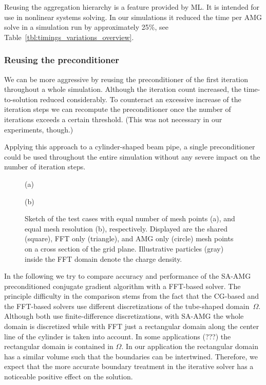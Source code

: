 Reusing the aggregation hierarchy is a feature provided by ML.  It is
intended for use in nonlinear systems solving.  In our simulations it
reduced the time per AMG solve in a simulation run by approximately
25\%, see Table~\ref{tbl:timings_variations_overview}.

\subsubsection*{Reusing the preconditioner}

We can be more aggressive by reusing the preconditioner of the first
iteration throughout a whole simulation.  Although the iteration count
increased, the time-to-solution reduced considerably.  To counteract an
excessive increase of the iteration steps we can recompute the
preconditioner once the number of iterations exceeds a certain
threshold.  (This was not necessary in our experiments, though.)

Applying this approach to a cylinder-shaped beam pipe, a single
preconditioner could be used throughout the entire simulation without
any severe impact on the number of iteration steps.

\begin{figure}[ht]
  \begin{minipage}[b]{0.5\textwidth}
    \centering
    

    (a)
  \end{minipage}
  \begin{minipage}[b]{0.5\textwidth}
    \centering
    

    (b)
  \end{minipage} 
  \caption{Sketch of the test cases with equal number of mesh points
    (a), and equal mesh resolution (b), respectively.  Displayed are the
    shared (square), FFT only (triangle), and AMG only (circle) mesh
    points on a cross section of the grid plane.  Illustrative particles
    (gray) inside the FFT domain denote the charge density.}

  \label{fig:meshcmp}
\end{figure}

In the following we try to compare accuracy and performance of the
SA-AMG preconditioned conjugate gradient algorithm with a FFT-based
solver.  The principle difficulty in the comparison stems from the fact
that the CG-based and the FFT-based solvers use different
discretizations of the tube-shaped domain~$\Omega$.  Although both use
finite-difference discretizations, with SA-AMG the whole domain is
discretized while with FFT just a rectangular domain along the center
line of the cylinder is taken into account.  In some applications
({\color{red}???}) the rectangular domain is contained in $\Omega$.  In
our application the rectangular domain has a similar volume such that
the boundaries can be intertwined.  Therefore, we expect that the more
accurate boundary treatment in the iterative solver has a noticeable
positive effect on the solution.

